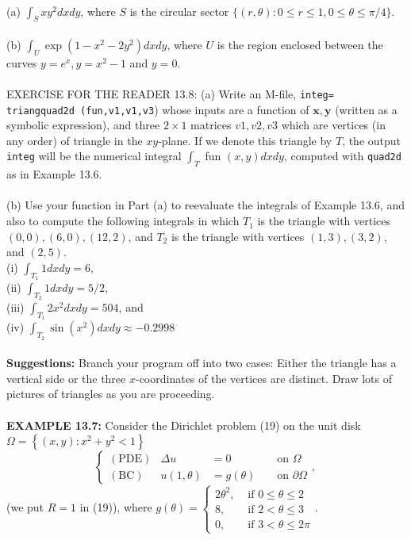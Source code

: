 \documentclass[../main.tex]{subfiles}
\begin{document}
\\
(a) $\int_{S} x y^{2} d x d y$, where $S$ is the circular sector $\{(r, \theta): 0 \leq r \leq 1,0 \leq \theta \leq \pi / 4\}$.
\\
\\
(b) $\int_{U} \exp \left(1-x^{2}-2 y^{2}\right) d x d y$, where $U$ is the region enclosed between the curves $y=e^{x}, y=x^{2}-1$ and $y=0$.
\\
\\
EXERCISE FOR THE READER 13.8: (a) Write an M-file, \texttt{integ= triangquad2d (fun,v1,v1,v3}) whose inputs are a function of $\mathbf{x}, \mathbf{y}$ (written as a symbolic expression), and three $2 \times 1$ matrices \texttt{$v 1, v 2, v 3$} which are vertices (in any order) of triangle in the $x y$-plane. If we denote this triangle by $T$, the output \texttt{integ} will be the numerical integral $\int_{T}$ fun $(x, y) d x d y$, computed with \texttt{quad2d} as in Example 13.6.
\\
\\
(b) Use your function in Part (a) to reevaluate the integrals of Example 13.6, and also to compute the following integrals in which $T_{1}$ is the triangle with vertices $(0,0),(6,0),(12,2)$, and $T_{2}$ is the triangle with vertices $(1,3),(3,2)$, and $(2,5)$.
\\
(i) $\int_{T_{1}} 1 d x d y=6$,\\
(ii) $\int_{T_{2}} 1 d x d y=5 / 2$,\\
(iii) $\int_{T_{1}} 2 x^{2} d x d y=504$, and\\
(iv) $\int_{T_{2}} \sin \left(x^{2}\right) d x d y \approx-0.2998$
\\
\\
\textbf{Suggestions:} Branch your program off into two cases: Either the triangle has a vertical side or the three $x$-coordinates of the vertices are distinct. Draw lots of pictures of triangles as you are proceeding.
\\
\\
\textbf{EXAMPLE 13.7:} Consider the Dirichlet problem (19) on the unit disk $\Omega=\left\{(x, y): x^{2}+y^{2}<1\right\}$
\\
$$
\left\{\begin{array}{lrlrl}
(\mathrm{PDE}) & \Delta u & =0 & & \text { on } \Omega \\
(\mathrm{BC}) & u(1, \theta) & =g(\theta) & & \text { on } \partial \Omega
\end{array}\right. \text {, }
$$
(we put $R=1$ in (19)), where $g(\theta)=\left\{\begin{array}{ll}2 \theta^{2}, & \text { if } 0 \leq \theta \leq 2 \\ 8, & \text { if } 2<\theta \leq 3 \\ 0, & \text { if } 3<\theta \leq 2 \pi\end{array}\right.$.
\end{document}
